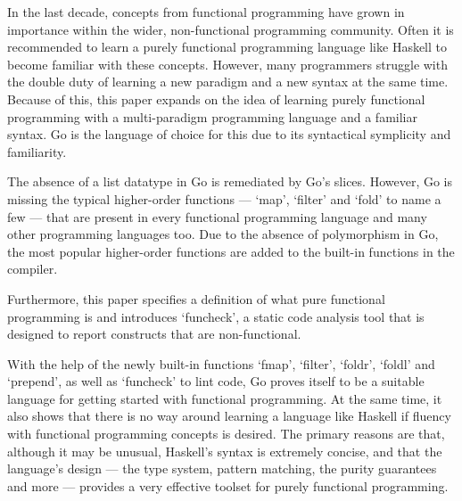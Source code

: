
In the last decade, concepts from functional programming have grown in
importance within the wider, non-functional programming community.
Often it is recommended to learn a purely functional programming language
like Haskell to become familiar with these concepts.
However, many programmers struggle with the double duty
of learning a new paradigm and a new syntax at the same time. Because of
this, this paper expands on the idea of learning purely functional programming
with a multi-paradigm programming language and a familiar syntax. Go
is the language of choice for this due to its syntactical symplicity
and familiarity.

The absence of a list datatype in Go is remediated by Go's slices.
However, Go is missing the typical higher-order functions ---
`map', `filter' and `fold' to name a few --- that are present in every
functional programming language and many other programming languages too.
Due to the absence of polymorphism in Go, the most popular higher-order
functions are added to the built-in functions in the compiler.

Furthermore, this paper specifies a definition of what pure functional programming is and
introduces `funcheck', a static code analysis tool that is designed to
report constructs that are non-functional.

With the help of the newly built-in functions `fmap', `filter', `foldr', `foldl' and
`prepend', as well as `funcheck' to lint code, Go proves itself to be a
suitable language for getting started with functional programming.
At the same time, it also shows that there is no way around learning a
language like Haskell if fluency with functional programming concepts
is desired. The primary reasons are that, although it may be unusual, Haskell's
syntax is extremely concise, and that the language's design --- the type system,
pattern matching, the purity guarantees and more --- provides a very effective toolset
for purely functional programming.
